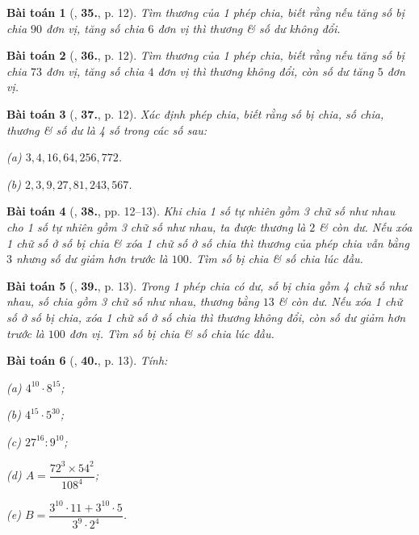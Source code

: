 \documentclass{article}
\numberwithin{equation}{section}
\newtheorem{baitoan}{Bài toán}[section]
\begin{document}
\begin{baitoan}[\cite{Binh_Toan_6_tap_1}, \textbf{35.}, p. 12]
	Tìm thương của 1 phép chia, biết rằng nếu tăng số bị chia $90$ đơn vị, tăng số chia $6$ đơn vị thì thương \& số dư không đổi.
\end{baitoan}

\begin{baitoan}[\cite{Binh_Toan_6_tap_1}, \textbf{36.}, p. 12]
	Tìm thương của 1 phép chia, biết rằng nếu tăng số bị chia $73$ đơn vị, tăng số chia $4$ đơn vị thì thương không đổi, còn số dư tăng $5$ đơn vị.
\end{baitoan}

\begin{baitoan}[\cite{Binh_Toan_6_tap_1}, \textbf{37.}, p. 12]
	Xác định phép chia, biết rằng số bị chia, số chia, thương \& số dư là 4 số trong các số sau:
	\begin{enumerate*}
		\item[(a)] $3,4,16,64,256,772$.
		\item[(b)] $2,3,9,27,81,243,567$.
	\end{enumerate*}
\end{baitoan}

\begin{baitoan}[\cite{Binh_Toan_6_tap_1}, \textbf{38.}, pp. 12--13]
	Khi chia 1 số tự nhiên gồm 3 chữ số như nhau cho 1 số tự nhiên gồm 3 chữ số như nhau, ta được thương là $2$ \& còn dư. Nếu xóa 1 chữ số ở số bị chia \& xóa 1 chữ số ở số chia thì thương của phép chia vẫn bằng $3$ nhưng số dư giảm hơn trước là $100$. Tìm số bị chia \& số chia lúc đầu.
\end{baitoan}

\begin{baitoan}[\cite{Binh_Toan_6_tap_1}, \textbf{39.}, p. 13]
	Trong 1 phép chia có dư, số bị chia gồm 4 chữ số như nhau, số chia gồm 3 chữ số như nhau, thương bằng $13$ \& còn dư. Nếu xóa 1 chữ số ở số bị chia, xóa 1 chữ số ở số chia thì thương không đổi, còn số dư giảm hơn trước là $100$ đơn vị. Tìm số bị chia \& số chia lúc đầu.
\end{baitoan}

\begin{baitoan}[\cite{Binh_Toan_6_tap_1}, \textbf{40.}, p. 13]
	Tính:\\
	\begin{enumerate*}
		\item[(a)] $4^{10}\cdot 8^{15}$;
		\item[(b)] $4^{15}\cdot 5^{30}$;
		\item[(c)] $27^{16}:9^{10}$;
		\item[(d)] $A = \dfrac{72^3\times 54^2}{108^4}$;
		\item[(e)] $B = \dfrac{3^{10}\cdot 11 + 3^{10}\cdot 5}{3^9\cdot 2^4}$.
	\end{enumerate*}
\end{baitoan}
\end{document}
